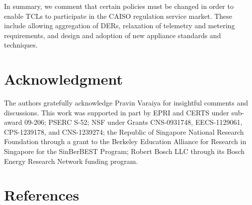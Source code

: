 \documentclass[onecolumn,journal]{IEEEtran}
\begin{document}
In summary, we comment that certain policies must be changed in order to enable TCLs to participate in the CAISO regulation service market. These include allowing aggregation of DERs, relaxation of telemetry and metering requirements, and design and adoption of new appliance standards and techniques.


\section*{Acknowledgment}
The authors gratefully acknowledge Pravin Varaiya for insightful comments and discussions. This work was supported in part by EPRI and CERTS under sub-award 09-206; PSERC S-52; NSF under Grants CNS-0931748, EECS-1129061, CPS-1239178, and CNS-1239274; the Republic of Singapore National Research Foundation through a grant to the Berkeley Education Alliance for Research in Singapore for the SinBerBEST Program; Robert Bosch LLC through its Bosch Energy Research Network funding program. 



\section*{References}
    
\end{document}
